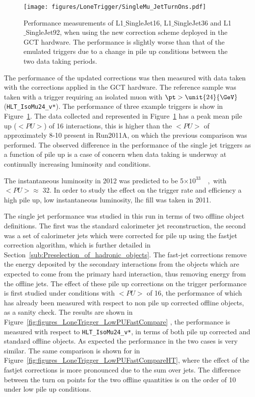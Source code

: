 \begin{figure}[htbp]
  \centering
    \texttt{[image: figures/LoneTrigger/SingleMu\_JetTurnOns.pdf]}
  \caption{Performance measurements of L1$\_$SingleJet16, L1$\_$SingleJet36 and L1$\_$SingleJet92, when using the new correction scheme deployed in the GCT hardware. The performance is slightly worse than that of the emulated triggers due to a change in pile up conditions between the two data taking periods.}
  \label{fig:figures_LoneTrigger_SingleMu_JetTurnOns}
\end{figure}

The performance of the updated corrections was then measured with data taken 
with the corrections applied in the GCT hardware. The reference sample was 
taken with a trigger requiring an isolated muon with $\pt > \unit{24}{\GeV}$  (\verb|HLT_IsoMu24_v*|).
The performance of three example triggers is show in 
Figure~\ref{fig:figures_LoneTrigger_SingleMu_JetTurnOns}.
The data collected and represented in 
Figure~\ref{fig:figures_LoneTrigger_SingleMu_JetTurnOns} has a peak mean pile 
up ($<PU>$) of 16 interactions, this is higher than the $<PU>$ of approximately 
8-10 present in Run2011A, on which the previous comparison was performed.
The observed difference in the performance of the \Lone single jet triggers as 
a function of pile up is a case of concern when data taking is underway at continually increasing luminosity and \pu conditions.

The instantaneous luminosity in 2012 was predicted to be \unit{5$\times 10 ^{33}$}{\lumiunits}, with $<PU> \approx$ 32. In order to study the effect on the trigger rate and efficiency a high pile up, low instantaneous luminosity, \ac{lhc} fill was taken in 2011.

The \Lone single jet performance was studied in this run in terms of two 
offline object definitions. The first was the standard \AK calorimeter jet 
reconstruction, the second was a set of \AK calorimeter jets which were 
corrected for pile up using the fastjet correction algorithm, which is further 
detailed in Section~\ref{sub:Preselection_of_hadronic_objects}.
The fast-jet corrections remove the energy deposited by the secondary 
interactions from the objects which are expected to come from the primary hard 
interaction, thus removing energy from the offline jets.
The effect of these pile up corrections on the \Lone trigger performance is 
first studied under conditions with $<PU>$ of 16, the performance of which has 
already been measured with respect to non pile up corrected offline objects, as 
a sanity check. The results are shown in 
Figure~\ref{fig:figures_LoneTrigger_LowPUFastCompare} , the performance is 
measured with respect to \verb|HLT_IsoMu24_v*|, in terms of both pile up 
corrected and standard offline objects. As expected the performance in the two 
cases is very similar. The same comparison is shown for \HT in 
Figure~\ref{fig:figures_LoneTrigger_LowPUFastCompareHT}, where the effect of 
the fastjet\cite{Cacciari:2011ma} corrections is more pronounced due to the sum over jets. The difference between the turn on points for the two offline quantities is on the order of \unit{10}{\GeV} under low pile up conditions.

